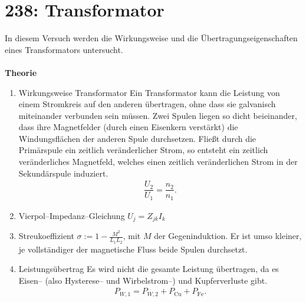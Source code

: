 \section{238: Transformator}
In diesem Versuch werden die Wirkungsweise und die Übertragungseigenschaften eines Transformators untersucht.\\\\
\textbf{Theorie} 
\begin{enumerate}[label=--]
        \item Wirkungsweise Transformator \hspace{25pt}
                Ein Transformator kann die Leistung von einem Stromkreis auf den anderen übertragen, ohne dass sie galvanisch miteinander verbunden sein müssen.
                Zwei Spulen liegen so dicht beieinander, dass ihre Magnetfelder (durch einen Eisenkern verstärkt) die Windungsflächen der anderen Spule durchsetzen.
                Fließt durch die Primärspule ein zeitlich veränderlicher Strom, so entsteht ein zeitlich veränderliches Magnetfeld, welches einen zeitlich veränderlichen Strom in der Sekundärspule induziert.
                \begin{align} 
                        \dfrac{U_2}{U_1}=\dfrac{n_2}{n_1}
                .\end{align} 
        \item Vierpol--Impedanz--Gleichung \hspace{25pt} 
                $U_j=Z_{jk}I_k$
        \item Streukoeffizient \hspace{25pt} 
                $\sigma :=1-\tfrac{M^2}{L_1L_2}$, mit $M$ der Gegeninduktion.
                Er ist umso kleiner, je vollständiger der magnetische Fluss beide Spulen durchsetzt.
        \item Leistungsübertrag \hspace{25pt}
                Es wird nicht die gesamte Leistung übertragen, da es Eisen-- (also Hysterese-- und Wirbelstrom--) und Kupferverluste gibt.
                \begin{align} 
                        P _{W,1}=P _{W,2}+P _{\text{Cu}}+P _{\text{Fe}}
                .\end{align} 
\end{enumerate}

\newpage
